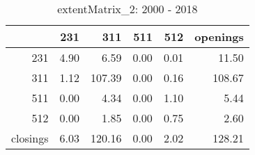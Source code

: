 \begin{table}[ht]
\centering
\begin{tabular}{rrrrrr}
  \hline
 & 231 & 311 & 511 & 512 & openings \\ 
  \hline
231 & 4.90 & 6.59 & 0.00 & 0.01 & 11.50 \\ 
  311 & 1.12 & 107.39 & 0.00 & 0.16 & 108.67 \\ 
  511 & 0.00 & 4.34 & 0.00 & 1.10 & 5.44 \\ 
  512 & 0.00 & 1.85 & 0.00 & 0.75 & 2.60 \\ 
  closings & 6.03 & 120.16 & 0.00 & 2.02 & 128.21 \\ 
   \hline
\end{tabular}
\caption{extentMatrix\_2: 2000 - 2018} 
\end{table}
